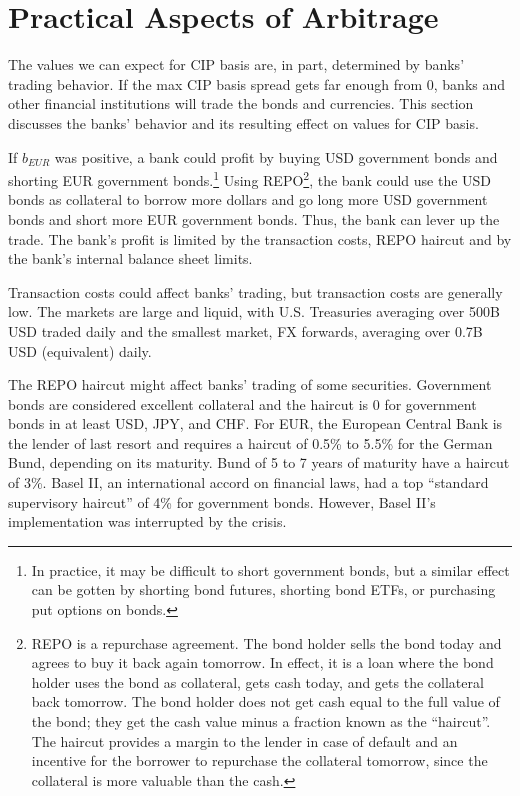 \fi




\section{Practical Aspects of Arbitrage}

The values we can expect for CIP basis are, in part, determined by banks' trading behavior.  If the max CIP basis spread gets far enough from 0, banks and other financial institutions will trade the bonds and currencies.  This section discusses the banks' behavior and its resulting effect on values for CIP basis.  

If $b_{EUR}$ was positive, a bank could profit by buying USD government bonds and shorting EUR government bonds.\footnote{In practice, it may be difficult to short government bonds, but a similar effect can be gotten by shorting bond futures, shorting bond ETFs, or purchasing put options on bonds.}  Using REPO\footnote{REPO is a repurchase agreement.  The bond holder sells the bond today and agrees to buy it back again tomorrow.  In effect, it is a loan where the bond holder uses the bond as collateral, gets cash today, and gets the collateral back tomorrow.  The bond holder does not get cash equal to the full value of the bond; they get the cash value minus a fraction known as the ``haircut''.  The haircut provides a margin to the lender in case of default and an incentive for the borrower to repurchase the collateral tomorrow, since the collateral is more valuable than the cash.}, the bank could use the USD bonds as collateral to borrow more dollars and go long more USD government bonds and short more EUR government bonds.  Thus, the bank can lever up the trade.  The bank's profit is limited by the transaction costs, REPO haircut and by the bank's internal balance sheet limits.  

Transaction costs could affect banks' trading, but transaction costs are generally low.   The markets are large and liquid, with U.S. Treasuries averaging over 500B USD traded daily and the smallest market, FX forwards, averaging over 0.7B USD (equivalent) daily.\cite{BIS2016}

The REPO haircut might affect banks' trading of some securities.  Government bonds are considered excellent collateral and the haircut is 0 for government bonds in at least USD, JPY, and CHF.\cite{Du2017}   For EUR, the European Central Bank is the lender of last resort and requires a haircut of 0.5\% to 5.5\% for the German Bund, depending on its maturity.\cite{Cassola2016}  Bund of 5 to 7 years of maturity have a haircut of 3\%.  Basel II, an international accord on financial laws, had a top ``standard supervisory haircut'' of 4\% for government bonds.\cite{BaselII}  However, Basel II's implementation was interrupted by the crisis. 

